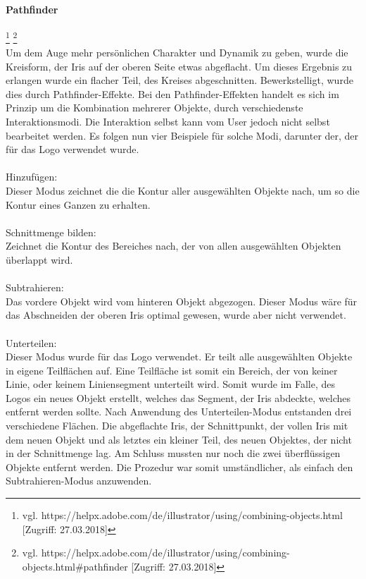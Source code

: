 \paragraph{Pathfinder}
\footnote{\label{} vgl. https://helpx.adobe.com/de/illustrator/using/combining-objects.html [Zugriff: 27.03.2018]}
\footnote{\label{} vgl. https://helpx.adobe.com/de/illustrator/using/combining-objects.html\#pathfinder  [Zugriff: 27.03.2018]}
\leavevmode \\
Um dem Auge mehr persönlichen Charakter und Dynamik zu geben, wurde die Kreisform, der Iris auf der oberen Seite etwas abgeflacht. Um dieses Ergebnis zu erlangen wurde ein flacher Teil, des Kreises abgeschnitten. Bewerkstelligt, wurde dies durch Pathfinder-Effekte. Bei den Pathfinder-Effekten handelt es sich im Prinzip um die Kombination mehrerer Objekte, durch verschiedenste Interaktionsmodi. Die Interaktion selbst kann vom User jedoch nicht selbst bearbeitet werden. Es folgen nun vier Beispiele für solche Modi, darunter der, der für das Logo verwendet wurde.
\leavevmode \\
\leavevmode \\
Hinzufügen:
\leavevmode \\
Dieser Modus zeichnet die die Kontur aller ausgewählten Objekte nach, um so die Kontur eines Ganzen zu erhalten.
\leavevmode \\
\leavevmode \\
Schnittmenge bilden:
\leavevmode \\
Zeichnet die Kontur des Bereiches nach, der von allen ausgewählten Objekten überlappt wird.
\leavevmode \\
\leavevmode \\
Subtrahieren:
\leavevmode \\
Das vordere Objekt wird vom hinteren Objekt abgezogen. Dieser Modus wäre für das Abschneiden der oberen Iris optimal gewesen, wurde aber nicht verwendet.
\leavevmode \\
\leavevmode \\
Unterteilen:
\leavevmode \\
Dieser Modus wurde für das Logo verwendet. Er teilt alle ausgewählten Objekte in eigene Teilflächen auf. Eine Teilfläche ist somit ein Bereich, der von keiner Linie, oder keinem Liniensegment unterteilt wird. Somit wurde im Falle, des Logos ein neues Objekt erstellt, welches das Segment, der Iris abdeckte, welches entfernt werden sollte. Nach Anwendung des Unterteilen-Modus entstanden drei verschiedene Flächen. Die abgeflachte Iris, der Schnittpunkt, der vollen Iris mit dem neuen Objekt und als letztes ein kleiner Teil, des neuen Objektes, der nicht in der Schnittmenge lag. Am Schluss mussten nur noch die zwei überflüssigen Objekte entfernt werden. Die Prozedur war somit umständlicher, als einfach den Subtrahieren-Modus anzuwenden.
\leavevmode \\

